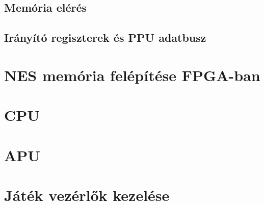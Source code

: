 	\subsection{Memória elérés}

	\subsection{Irányító regiszterek és PPU adatbusz}

\section{NES memória felépítése FPGA-ban}

\section{CPU}

\section{APU}

\section{Játék vezérlők kezelése}